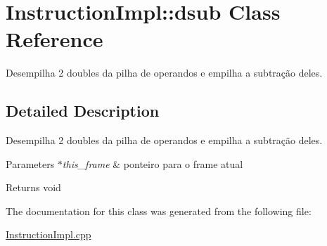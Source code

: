 \hypertarget{class_instruction_impl_1_1dsub}{}\section{Instruction\+Impl\+:\+:dsub Class Reference}
\label{class_instruction_impl_1_1dsub}


Desempilha 2 doubles da pilha de operandos e empilha a subtração deles.  




\subsection{Detailed Description}
Desempilha 2 doubles da pilha de operandos e empilha a subtração deles. 


\begin{DoxyParams}{Parameters}
{\em $\ast$this\+\_\+frame} & ponteiro para o frame atual \\
\hline
\end{DoxyParams}
\begin{DoxyReturn}{Returns}
void 
\end{DoxyReturn}


The documentation for this class was generated from the following file\+:\begin{DoxyCompactItemize}
\item 
\hyperlink{_instruction_impl_8cpp}{Instruction\+Impl.\+cpp}\end{DoxyCompactItemize}
